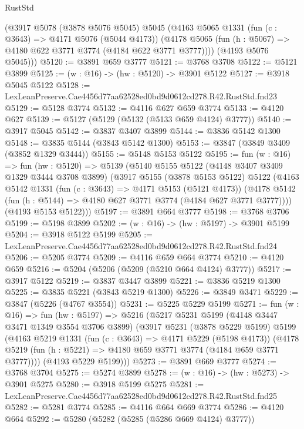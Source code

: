 \begin{lexlean}{RustStd}
\begin{coremodule}
      (@3917
        @5078
        (@3878 @5076 @5045)
        @5045
        (@4163
          @5065
          @1331
          (fun (c : @3643) => @4171 @5076 (@5044 @4173))
          (@4178 @5065 (fun (h : @5067) => @4180 @622 @3771 @3774 (@4184 @622 @3771 @3777))))
        (@4193 @5076 @5045)))
@5120 := @3891 @659 @3777
@5121 := @3768 @3708
@5122 := @5121 @3899
@5125 := (w : @16) -> (hw : @5120) -> @3901 @5122
@5127 := @3918 @5045 @5122
@5128 := LexLeanPreserve.Cae4456d77aa62528ed0bd9d0612cd278.R42.RustStd.fnd23
@5129 := @5128 @3774
@5132 := @4116 @627 @659 @3774
@5133 := @4120 @627
@5139 := @5127 (@5129 (@5132 (@5133 @659 @4124) @3777))
@5140 := @3917 @5045
@5142 := @3837 @3407 @3899
@5144 := @3836 @5142 @1300
@5148 := @3835 @5144 (@3843 @5142 @1300)
@5153 := @3847 (@3849 @3409 (@3852 @1329 @3444))
@5155 := @5148 @5153 @5122
@5195 := fun (w : @16) =>
  fun (hw : @5120) =>
  @5139
    (@5140
      @5155
      @5122
      (@4148 @3407 @3409 @1329 @3444 @3708 @3899)
      (@3917
        @5155
        (@3878 @5153 @5122)
        @5122
        (@4163
          @5142
          @1331
          (fun (c : @3643) => @4171 @5153 (@5121 @4173))
          (@4178 @5142 (fun (h : @5144) => @4180 @627 @3771 @3774 (@4184 @627 @3771 @3777))))
        (@4193 @5153 @5122)))
@5197 := @3891 @664 @3777
@5198 := @3768 @3706
@5199 := @5198 @3899
@5202 := (w : @16) -> (hw : @5197) -> @3901 @5199
@5204 := @3918 @5122 @5199
@5205 := LexLeanPreserve.Cae4456d77aa62528ed0bd9d0612cd278.R42.RustStd.fnd24
@5206 := @5205 @3774
@5209 := @4116 @659 @664 @3774
@5210 := @4120 @659
@5216 := @5204 (@5206 (@5209 (@5210 @664 @4124) @3777))
@5217 := @3917 @5122
@5219 := @3837 @3447 @3899
@5221 := @3836 @5219 @1300
@5225 := @3835 @5221 (@3843 @5219 @1300)
@5226 := @3849 @3471
@5229 := @3847 (@5226 (@4767 @3554))
@5231 := @5225 @5229 @5199
@5271 := fun (w : @16) =>
  fun (hw : @5197) =>
  @5216
    (@5217
      @5231
      @5199
      (@4148 @3447 @3471 @1349 @3554 @3706 @3899)
      (@3917
        @5231
        (@3878 @5229 @5199)
        @5199
        (@4163
          @5219
          @1331
          (fun (c : @3643) => @4171 @5229 (@5198 @4173))
          (@4178 @5219 (fun (h : @5221) => @4180 @659 @3771 @3774 (@4184 @659 @3771 @3777))))
        (@4193 @5229 @5199)))
@5273 := @3891 @669 @3777
@5274 := @3768 @3704
@5275 := @5274 @3899
@5278 := (w : @16) -> (hw : @5273) -> @3901 @5275
@5280 := @3918 @5199 @5275
@5281 := LexLeanPreserve.Cae4456d77aa62528ed0bd9d0612cd278.R42.RustStd.fnd25
@5282 := @5281 @3774
@5285 := @4116 @664 @669 @3774
@5286 := @4120 @664
@5292 := @5280 (@5282 (@5285 (@5286 @669 @4124) @3777))

\end{coremodule}
\end{lexlean}
